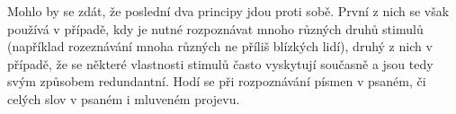 Mohlo by se zdát, že poslední dva principy jdou proti sobě. První z nich se
však používá v případě, kdy je nutné rozpoznávat mnoho různých druhů stimulů
(například rozeznávání mnoha různých ne příliš blízkých lidí), druhý z nich v
případě, že se některé vlastnosti stimulů často vyskytují současně a jsou tedy
svým způsobem redundantní. Hodí se při rozpoznávání písmen v psaném, či celých
slov v psaném i mluveném projevu.
